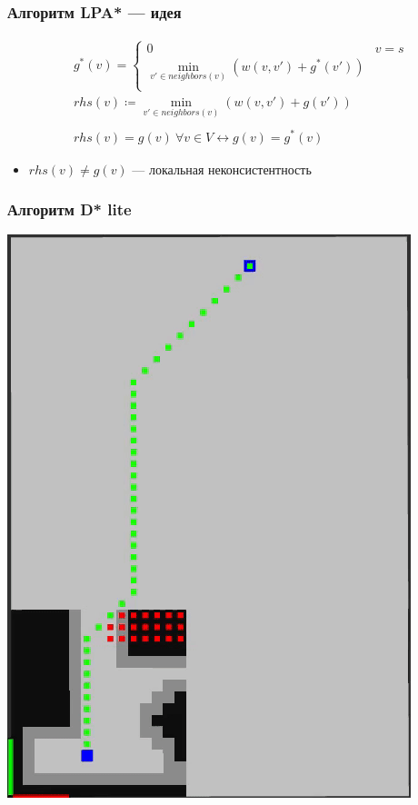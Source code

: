 \documentclass{beamer}
\begin{document}
    \begin{frame}
        \frametitle{Алгоритм LPA* --- идея}

        \begin{align*}
            &g^*(v) = \begin{cases}
                          0 &  v = s\\
                          \displaystyle \min_{v' \in neighbors(v)} (w(v, v') + g^*(v')) \\
            \end{cases} \\
            &rhs(v) \coloneq \min_{v' \in neighbors(v)} (w(v, v') + g(v')) \\ \\
            &rhs(v) = g(v)\ \forall v \in V \leftrightarrow g(v) = g^*(v)
        \end{align*}
        \begin{itemize}
            \item $rhs(v) \neq g(v)$ --- локальная неконсистентность
        \end{itemize}


    \end{frame}
    \begin{frame}[fragile]
        \frametitle{Алгоритм D* lite}
        \begin{center}
            \includegraphics[height=.75\textheight]{../figures/dstar8cells}
        \end{center}

    \end{frame}
\end{document}
